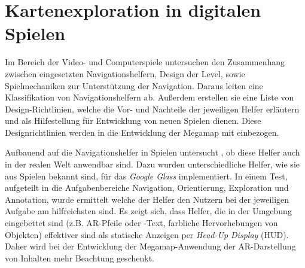 \section{Kartenexploration in digitalen Spielen}
Im Bereich der Video- und Computerspiele untersuchen \textcites{Moura2014}{Moura2015} den Zusammenhang zwischen eingesetzten Navigationshelfern, Design der Level, sowie Spielmechaniken zur Unterstützung der Navigation.
Daraus leiten \textcite{Moura2015} eine Klassifikation von Navigationshelfern ab.
Außerdem erstellen sie eine Liste von Design-Richtlinien, welche die Vor- und Nachteile der jeweiligen Helfer erläutern und als Hilfestellung für Entwicklung von neuen Spielen dienen.
Diese Designrichtlinien werden in die Entwicklung der Megamap mit einbezogen.

Aufbauend auf die Navigationshelfer in Spielen untersucht \textcite{Lodts2015}, ob diese Helfer auch in der realen Welt anwendbar sind.
Dazu wurden unterschiedliche Helfer, wie sie aus Spielen bekannt sind, für das \emph{Google Glass} implementiert.
In einem Test, aufgeteilt in die Aufgabenbereiche Navigation, Orientierung, Exploration und Annotation, wurde ermittelt welche der Helfer den Nutzern bei der jeweiligen Aufgabe am hilfreichsten sind.
Es zeigt sich, dass Helfer, die in der Umgebung eingebettet sind (z.B. AR-Pfeile oder -Text, farbliche Hervorhebungen von Objekten) effektiver sind als statische Anzeigen per \emph{Head-Up Display} (HUD).
Daher wird bei der Entwicklung der Megamap-Anwendung der AR-Darstellung von Inhalten mehr Beachtung geschenkt.
%
\cleardoublepage
